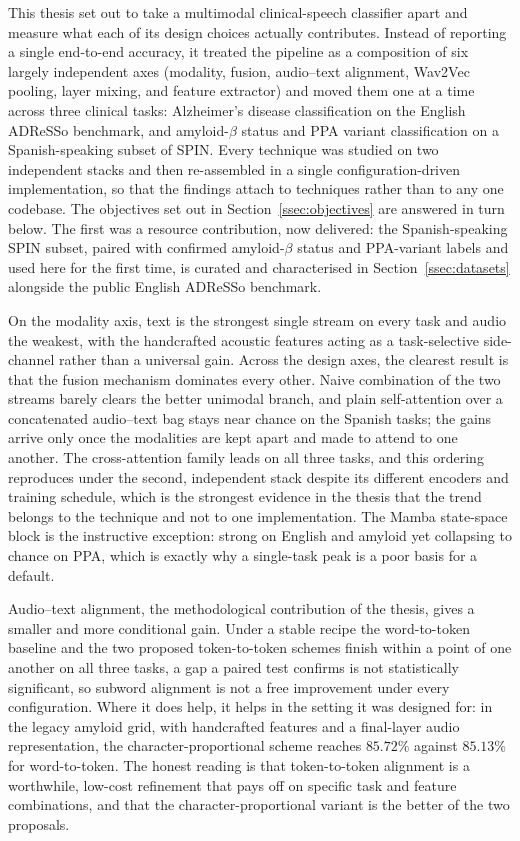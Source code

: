 \documentclass[a4paper,12pt]{article}
\begin{document}
This thesis set out to take a multimodal clinical-speech classifier apart and measure what each of its design choices actually contributes. Instead of reporting a single end-to-end accuracy, it treated the pipeline as a composition of six largely independent axes (modality, fusion, audio--text alignment, Wav2Vec pooling, layer mixing, and feature extractor) and moved them one at a time across three clinical tasks: Alzheimer's disease classification on the English ADReSSo benchmark, and amyloid-$\beta$ status and PPA variant classification on a Spanish-speaking subset of SPIN. Every technique was studied on two independent stacks and then re-assembled in a single configuration-driven implementation, so that the findings attach to techniques rather than to any one codebase. The objectives set out in Section~\ref{ssec:objectives} are answered in turn below. The first was a resource contribution, now delivered: the Spanish-speaking SPIN subset, paired with confirmed amyloid-$\beta$ status and PPA-variant labels and used here for the first time, is curated and characterised in Section~\ref{ssec:datasets} alongside the public English ADReSSo benchmark.

On the modality axis, text is the strongest single stream on every task and audio the weakest, with the handcrafted acoustic features acting as a task-selective side-channel rather than a universal gain. Across the design axes, the clearest result is that the fusion mechanism dominates every other. Naive combination of the two streams barely clears the better unimodal branch, and plain self-attention over a concatenated audio--text bag stays near chance on the Spanish tasks; the gains arrive only once the modalities are kept apart and made to attend to one another. The cross-attention family leads on all three tasks, and this ordering reproduces under the second, independent stack despite its different encoders and training schedule, which is the strongest evidence in the thesis that the trend belongs to the technique and not to one implementation. The Mamba state-space block is the instructive exception: strong on English and amyloid yet collapsing to chance on PPA, which is exactly why a single-task peak is a poor basis for a default.

Audio--text alignment, the methodological contribution of the thesis, gives a smaller and more conditional gain. Under a stable recipe the word-to-token baseline and the two proposed token-to-token schemes finish within a point of one another on all three tasks, a gap a paired test confirms is not statistically significant, so subword alignment is not a free improvement under every configuration. Where it does help, it helps in the setting it was designed for: in the legacy amyloid grid, with handcrafted features and a final-layer audio representation, the character-proportional scheme reaches $85.72\%$ against $85.13\%$ for word-to-token. The honest reading is that token-to-token alignment is a worthwhile, low-cost refinement that pays off on specific task and feature combinations, and that the character-proportional variant is the better of the two proposals.
\end{document}
